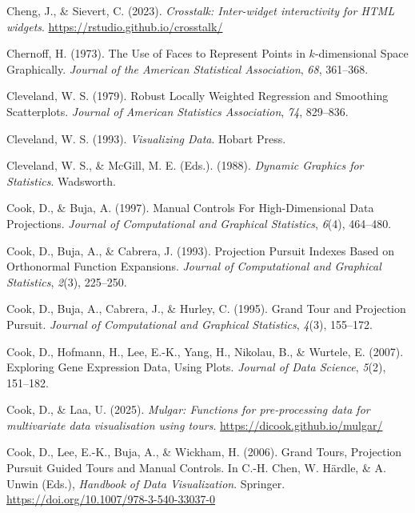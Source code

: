 \documentclass[
  letterpaper,
]{krantz}
\newlength{\cslhangindent}
\newenvironment{CSLReferences}[2] %
 {\begin{list}{}{%
  \setlength{\itemindent}{0pt}
  \setlength{\leftmargin}{0pt}
  \setlength{\parsep}{0pt}
  \ifodd #1
   \setlength{\leftmargin}{\cslhangindent}
   \setlength{\itemindent}{-1\cslhangindent}
  \fi
  \setlength{\itemsep}{#2\baselineskip}}}
 {\end{list}}
\begin{document}
\begin{CSLReferences}{1}{0}
Cheng, J., \& Sievert, C. (2023). \emph{Crosstalk: Inter-widget
interactivity for HTML widgets}.
\url{https://rstudio.github.io/crosstalk/}

Chernoff, H. (1973). The {U}se of {F}aces to {R}epresent {P}oints in
\(k\)-dimensional {S}pace {G}raphically. \emph{Journal of the American
Statistical Association}, \emph{68}, 361--368.

Cleveland, W. S. (1979). Robust {L}ocally {W}eighted {R}egression and
{S}moothing {S}catterplots. \emph{Journal of American Statistics
Association}, \emph{74}, 829--836.

Cleveland, W. S. (1993). \emph{Visualizing {D}ata}. Hobart Press.

Cleveland, W. S., \& McGill, M. E. (Eds.). (1988). \emph{Dynamic
{G}raphics for {S}tatistics}. Wadsworth.

Cook, D., \& Buja, A. (1997). {M}anual {C}ontrols {F}or
{H}igh-{D}imensional {D}ata {P}rojections. \emph{Journal of
Computational and Graphical Statistics}, \emph{6}(4), 464--480.

Cook, D., Buja, A., \& Cabrera, J. (1993). {P}rojection {P}ursuit
{I}ndexes {B}ased on {O}rthonormal {F}unction {E}xpansions.
\emph{Journal of Computational and Graphical Statistics}, \emph{2}(3),
225--250.

Cook, D., Buja, A., Cabrera, J., \& Hurley, C. (1995). Grand {T}our and
{P}rojection {P}ursuit. \emph{Journal of Computational and Graphical
Statistics}, \emph{4}(3), 155--172.

Cook, D., Hofmann, H., Lee, E.-K., Yang, H., Nikolau, B., \& Wurtele, E.
(2007). Exploring {G}ene {E}xpression {D}ata, {U}sing {P}lots.
\emph{Journal of Data Science}, \emph{5}(2), 151--182.

Cook, D., \& Laa, U. (2025). \emph{Mulgar: Functions for pre-processing
data for multivariate data visualisation using tours}.
\url{https://dicook.github.io/mulgar/}

Cook, D., Lee, E.-K., Buja, A., \& Wickham, H. (2006). {G}rand {T}ours,
{P}rojection {P}ursuit {G}uided {T}ours and {M}anual {C}ontrols. In
C.-H. Chen, W. Härdle, \& A. Unwin (Eds.), \emph{Handbook of {D}ata
{V}isualization}. Springer.
\url{https://doi.org/10.1007/978-3-540-33037-0}


\end{CSLReferences}
\end{document}
